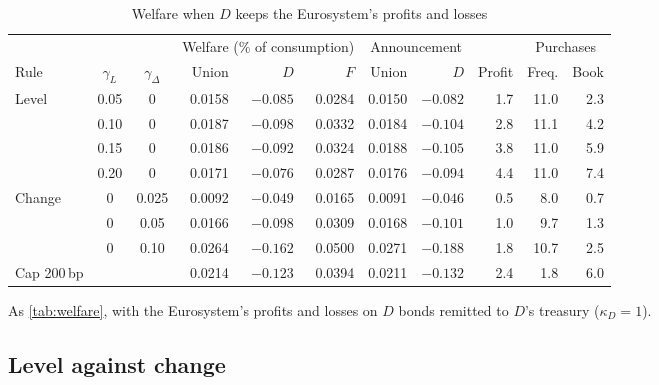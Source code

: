 \begin{table}[tbp]
  \centering
  \begin{threeparttable}
  \caption{Welfare when $D$ keeps the Eurosystem's profits and losses}
  \label{tab:welfare-key}
  \footnotesize\setlength{\tabcolsep}{3.5pt}
  \begin{tabular}{lcc rrr rr r rr}
    \toprule
    & & & \multicolumn{3}{c}{Welfare (\% of consumption)} & \multicolumn{2}{c}{Announcement}
      & & \multicolumn{2}{c}{Purchases} \\
    \cmidrule(lr){4-6}\cmidrule(lr){7-8}\cmidrule(lr){10-11}
    Rule & $\gamma_L$ & $\gamma_\Delta$ & Union & $D$ & $F$ & Union & $D$
      & Profit & Freq. & Book \\
    \midrule
    Level & 0.05 & 0 & 0.0158 & $-0.085$ & 0.0284 & 0.0150 & $-0.082$ & 1.7 & 11.0 & 2.3 \\
     & 0.10 & 0 & 0.0187 & $-0.098$ & 0.0332 & 0.0184 & $-0.104$ & 2.8 & 11.1 & 4.2 \\
     & 0.15 & 0 & 0.0186 & $-0.092$ & 0.0324 & 0.0188 & $-0.105$ & 3.8 & 11.0 & 5.9 \\
     & 0.20 & 0 & 0.0171 & $-0.076$ & 0.0287 & 0.0176 & $-0.094$ & 4.4 & 11.0 & 7.4 \\
    Change & 0 & 0.025 & 0.0092 & $-0.049$ & 0.0165 & 0.0091 & $-0.046$ & 0.5 & 8.0 & 0.7 \\
     & 0 & 0.05 & 0.0166 & $-0.098$ & 0.0309 & 0.0168 & $-0.101$ & 1.0 & 9.7 & 1.3 \\
     & 0 & 0.10 & 0.0264 & $-0.162$ & 0.0500 & 0.0271 & $-0.188$ & 1.8 & 10.7 & 2.5 \\
    Cap 200\,bp &  &  & 0.0214 & $-0.123$ & 0.0394 & 0.0211 & $-0.132$ & 2.4 & 1.8 & 6.0 \\
    \bottomrule
  \end{tabular}
  \begin{tablenotes}\footnotesize
  \item As \cref{tab:welfare}, with the Eurosystem's profits and losses on $D$ bonds remitted to $D$'s
  treasury ($\kappa_D=1$).
  \end{tablenotes}
  \end{threeparttable}
\end{table}

\subsection{Level against change}
\label{sec:welfare-level-change}

